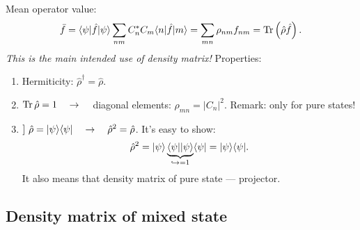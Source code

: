 Mean operator value:
\begin{equation}
	\bar{f} = \langle\psi\rvert \hat{f} \lvert\psi\rangle \sum_{nm} C_n^* C_m \langle n\rvert \hat{f} \lvert m\rangle = \sum_{mn} \rho_{nm} f_{nm} = \operatorname{Tr} \left(\hat{\rho} \hat{f}\right).
\end{equation}
\textit{This is the main intended use of density matrix!} Properties:
\begin{enumerate}
	\item Hermiticity: $\hat{\rho}^{\dagger} = \hat{\rho}$.
	\item $\operatorname{Tr} \hat{\rho} = 1 \quad \to \quad$ diagonal elements: $\rho_{mn} = \left| C_n \right|^2$.  Remark: only for pure states!
	\item $]\  \hat{\rho} = \lvert\psi\rangle \langle\psi\rvert \quad \to \quad \hat{\rho}^2 = \hat{\rho}$. It's easy to show:
	\begin{equation}
		\hat{\rho}^2 = \lvert\psi\rangle \underbrace{\langle\psi\rvert \lvert\psi\rangle}_{\hookrightarrow = 1} \langle\psi\rvert = \lvert\psi\rangle \langle\psi\rvert.
	\end{equation}
	It also means that density matrix of pure state --- projector.
\end{enumerate}

\subsection{Density matrix of mixed state}

